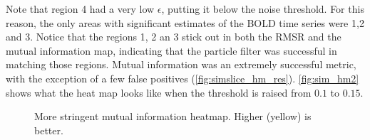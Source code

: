 Note that region 4 had a very low $\epsilon$, putting it below the noise
threshold. For this reason, the only areas
with significant estimates of the \ac{BOLD} time series were 1,2 and 3.
Notice that the
regions 1, 2 an 3 stick out in both the \ac{RMSR} and the mutual information
map, indicating that the particle filter was successful in matching those regions.
Mutual information was an extremely successful metric, with the exception of
a few false positives (\autoref{fig:simslice_hm_res}). 
\autoref{fig:sim_hm2} shows what the heat map looks
like when the threshold is raised from $0.1$ to $0.15$.
\begin{figure}
\centering
{}
\caption{More stringent mutual information heatmap. Higher (yellow) is better.}
\label{fig:sim_hm2}
\end{figure}

